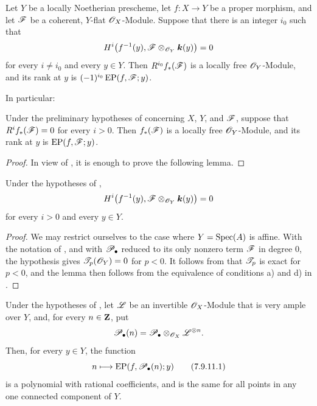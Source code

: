 \begin{corollary}[7.9.9]
\label{III.7.9.9}
Let $Y$ be a locally Noetherian prescheme, let
$f:X\to Y$ be a proper morphism, and let $\mathscr{F}$ be a
coherent, $Y$-flat $\mathscr{O}_X$-Module.  Suppose that there
is an integer $i_0$ such that
\[
  H^i\bigl(f^{-1}(y),
    \mathscr{F}\otimes_{\mathscr{O}_Y}\boldsymbol{k}(y)\bigr)=0
\]
for every $i\neq i_0$ and every $y\in Y$.  Then
$R^{i_0}f_*(\mathscr{F})$ is a locally free
$\mathscr{O}_Y$-Module, and its rank at $y$ is
$(-1)^{i_0}\operatorname{EP}(f,\mathscr{F};y)$.
\end{corollary}

In particular:

\begin{corollary}[7.9.10]
\label{III.7.9.10}
Under the preliminary hypotheses of 
concerning $X$, $Y$, and $\mathscr{F}$, suppose that
$R^if_*(\mathscr{F})=0$ for every $i>0$.  Then
$f_*(\mathscr{F})$ is a locally free $\mathscr{O}_Y$-Module, and its
rank at $y$ is $\operatorname{EP}(f,\mathscr{F};y)$.
\end{corollary}

\begin{proof}
In view of , it is enough to prove the
following lemma.
\end{proof}

\begin{lemma}[7.9.10.1]
\label{III.7.9.10.1}
Under the hypotheses of ,
\[
  H^i\bigl(f^{-1}(y),
    \mathscr{F}\otimes_{\mathscr{O}_Y}\boldsymbol{k}(y)\bigr)=0
\]
for every $i>0$ and every $y\in Y$.
\end{lemma}

\begin{proof}
We may restrict ourselves to the case where
$Y=\operatorname{Spec}(A)$ is affine.  With the notation of
, and with $\mathscr{P}_\bullet$ reduced to its
only nonzero term $\mathscr{F}$ in degree $0$, the hypothesis
gives $\mathscr{T}_p(\mathscr{O}_Y)=0$ for $p<0$.  It follows from
 that $\mathscr{T}_p$ is exact for $p<0$, and
the lemma then follows from the equivalence of conditions
a) and d) in .
\end{proof}

\begin{proposition}[7.9.11]
\label{III.7.9.11}
Under the hypotheses of , let $\mathscr{L}$ be
an invertible $\mathscr{O}_X$-Module that is very ample over
$Y$, and, for every $n\in\mathbf{Z}$, put
\[
  \mathscr{P}_\bullet(n)
  =
  \mathscr{P}_\bullet
    \otimes_{\mathscr{O}_X}\mathscr{L}^{\otimes n}.
\]
Then, for every $y\in Y$, the function
\[
  n\longmapsto
  \operatorname{EP}(f,\mathscr{P}_\bullet(n);y)
  \tag{7.9.11.1}\label{III.7.9.11.1}
\]
is a polynomial with rational coefficients, and is the
same for all points in any one connected component of
$Y$.
\end{proposition}

